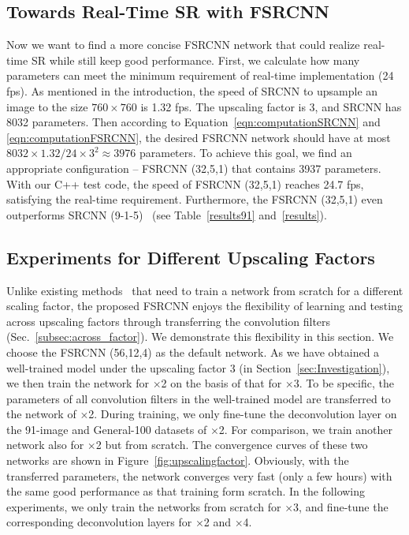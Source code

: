 \documentclass[runningheads]{llncs}
\begin{document}
\subsection{Towards Real-Time SR with FSRCNN}
Now we want to find a more concise FSRCNN network that could realize real-time SR while still keep good performance. First, we calculate how many parameters can meet the minimum requirement of real-time implementation (24 fps). As mentioned in the introduction, the speed of SRCNN to upsample an image to the size $760\times 760$ is 1.32 fps. The upscaling factor is 3, and SRCNN has 8032 parameters. Then according to Equation~\ref{eqn:computationSRCNN} and \ref{eqn:computationFSRCNN}, the desired FSRCNN network should have at most $8032\times 1.32/24\times 3^2\approx 3976$ parameters. To achieve this goal, we find an appropriate configuration --  FSRCNN (32,5,1) that contains 3937 parameters. With our C++ test code, the speed of FSRCNN (32,5,1) reaches 24.7 fps, satisfying the real-time requirement. Furthermore, the FSRCNN (32,5,1) even outperforms SRCNN (9-1-5)~\cite{Dong2014} (see Table~\ref{results91} and~\ref{results}). 

\subsection{Experiments for Different Upscaling Factors}
\label{sec:transfer}

Unlike existing methods~\cite{Dong2014,Dong2015} that need to train a network from scratch for a different scaling factor, the proposed FSRCNN enjoys the flexibility of learning and testing across upscaling factors through transferring the convolution filters (Sec.~\ref{subsec:across_factor}). We demonstrate this flexibility in this section.
We choose the FSRCNN (56,12,4) as the default network. As we have obtained a well-trained model under the upscaling factor 3 (in Section~\ref{sec:Investigation}), we then train the network for $\times$2 on the basis of that for $\times$3. To be specific, the parameters of all convolution filters in the well-trained model are transferred to the network of $\times$2. During training, we only fine-tune the deconvolution layer on the 91-image and General-100 datasets of $\times$2. For comparison, we train another network also for $\times$2 but from scratch. The convergence curves of these two networks are shown in Figure~\ref{fig:upscalingfactor}. Obviously, with the transferred parameters, the network converges very fast (only a few hours) with the same good performance as that training form scratch.
In the following experiments, we only train the networks from scratch for $\times$3, and fine-tune the corresponding deconvolution layers for $\times$2 and $\times$4.
\end{document}
